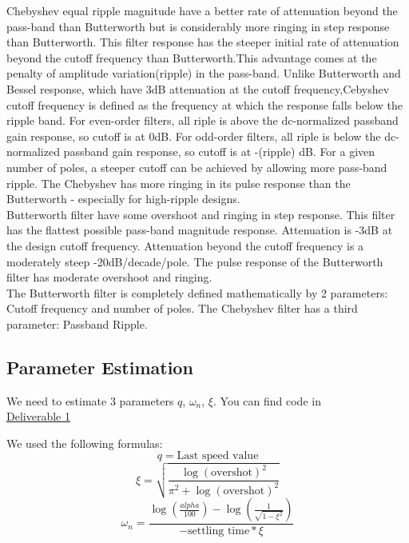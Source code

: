 \documentclass[a4paper,12pt,oneside]{article}
\begin{document}
Chebyshev equal ripple magnitude have a better rate of attenuation beyond the pass-band than Butterworth but is considerably more ringing in step response than Butterworth.
This filter response has the steeper initial rate of attenuation beyond the cutoff frequency than Butterworth.This advantage comes at the penalty of amplitude variation(ripple) in the pass-band. Unlike Butterworth and Bessel response, which have 3dB attenuation at the cutoff frequency,Cebyshev cutoff frequency is defined as the frequency at which the response falls below the ripple band. For even-order filters, all riple is above the dc-normalized passband gain response, so cutoff is at 0dB. For odd-order filters, all riple is below the dc-normalized passband gain response, so cutoff is at -(ripple) dB. For a given number of poles, a steeper cutoff can be achieved by allowing more pass-band ripple. The Chebyshev has more ringing in its pulse response than the Butterworth - especially for high-ripple designs.
\\
 Butterworth filter have some overshoot and ringing in step response. This filter has the flattest possible pass-band magnitude response. Attenuation is -3dB at the design cutoff frequency. Attenuation beyond the cutoff frequency is a moderately steep -20dB/decade/pole. The pulse response of the Butterworth filter has moderate overshoot and ringing.
\\
The Butterworth filter is completely defined mathematically by 2 parameters: Cutoff frequency and number of poles. The Chebyshev filter has a third parameter: Passband Ripple.

\subsection {Parameter Estimation}
We need to estimate 3 parameters $q$, $\omega_{n}$, $\xi$. You can find code in 
\\
 \href{https://github.com/etumanov/AppliedRoboticsUNITN/tree/master/DeliverableNI}{Deliverable 1}

We used the following formulas:
\begin{equation}
q = \text{Last speed value}
\end{equation}
\begin{equation}
\xi = \sqrt{\frac{\log(\text{overshot}) ^ 2}{\pi ^ 2 + \log(\text{overshot}) ^ 2}}
\end{equation}
\begin{equation}
\omega_{n} =  \frac{\log(\frac{alpha}{100}) -\log(\frac{1}{\sqrt{1-\xi^2}})}{-\text{settling time} * \xi}
\end{equation} 
\end{document}
